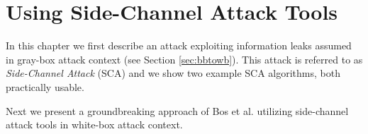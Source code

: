 \chapter{Using Side-Channel Attack Tools}
\label{chap:attack}

In this chapter we first describe an attack exploiting information leaks assumed in gray-box attack context (see Section \ref{sec:bbtowb}). This attack is referred to as {\em Side-Channel Attack} (SCA) and we show two example SCA algorithms, both practically usable.

Next we present a groundbreaking approach of Bos et al. \cite{bos2015differential} utilizing side-channel attack tools in white-box attack context.





